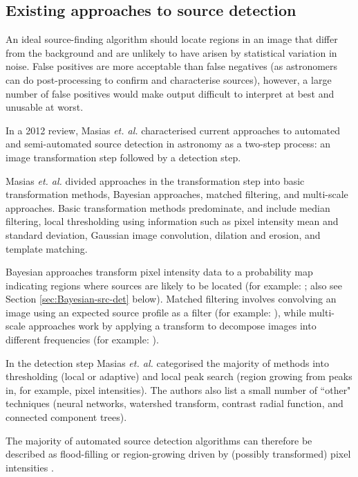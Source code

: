 \subsection{Existing approaches to source detection}

An ideal source-finding algorithm should locate regions in an image that differ from the background and are unlikely to have arisen by statistical variation in noise. False positives are more acceptable than false negatives (as astronomers can do post-processing to confirm and characterise sources), however, a large number of false positives would make output difficult to interpret at best and unusable at worst.

In a 2012 review, Masias \emph{et. al.} \cite{masias2012review} characterised current approaches to automated and semi-automated source detection in astronomy as a two-step process: an image transformation step followed by a detection step. 

Masias \emph{et. al.} divided approaches in the transformation step into basic transformation methods, Bayesian approaches, matched filtering, and multi-scale approaches. Basic transformation methods predominate, and include median filtering, local thresholding using information such as pixel intensity mean and standard deviation, Gaussian image convolution, dilation and erosion, and template matching.

Bayesian approaches transform pixel intensity data to a probability map indicating regions where sources are likely to be located (for example: \cite{feroz2008multimodal}; also see Section \ref{sec:Bayesian-src-det} below). Matched filtering involves convolving an image using an expected source profile as a filter (for example: \cite{torrent2010detecting}), while multi-scale approaches work by applying a transform to decompose images into different frequencies (for example: \cite{peracaula2011segmentation}). 

In the detection step Masias \emph{et. al.} categorised the majority of methods into thresholding (local or adaptive) and local peak search (region growing from peaks in, for example, pixel intensities). The authors also list a small number of ``other" techniques (neural networks, watershed transform, contrast radial function, and connected component trees).

The majority of automated source detection algorithms can therefore be described as flood-filling or region-growing driven by (possibly transformed) pixel intensities \cite{masias2012review}.

